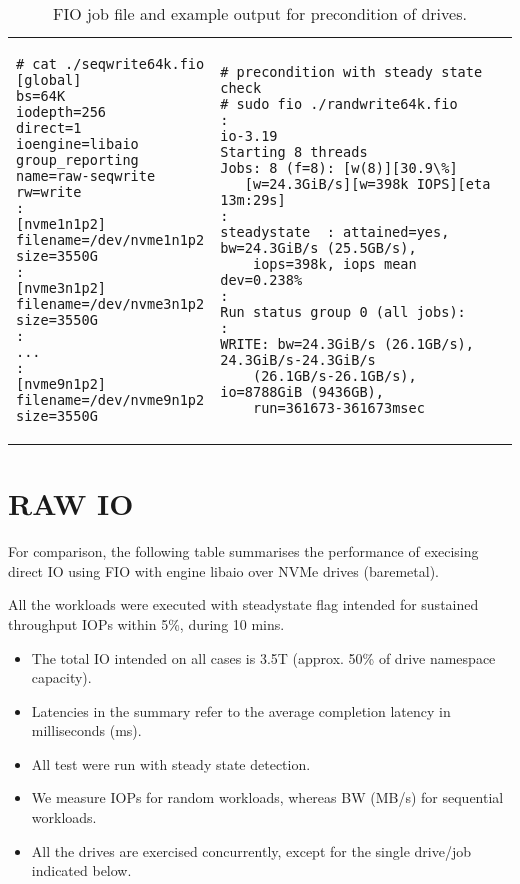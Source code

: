 \begin{table}[h!]
\centering
\begin{tabular}{V{0.35\textwidth}V{0.60\textwidth}}
\toprule
\begin{verbatim}
# cat ./seqwrite64k.fio
[global]
bs=64K
iodepth=256
direct=1
ioengine=libaio
group_reporting
name=raw-seqwrite
rw=write
:
[nvme1n1p2]
filename=/dev/nvme1n1p2
size=3550G
:
[nvme3n1p2]
filename=/dev/nvme3n1p2
size=3550G
:
...
:
[nvme9n1p2]
filename=/dev/nvme9n1p2
size=3550G
\end{verbatim}
&
\begin{verbatim}
# precondition with steady state check
# sudo fio ./randwrite64k.fio
:
io-3.19
Starting 8 threads
Jobs: 8 (f=8): [w(8)][30.9\%]
   [w=24.3GiB/s][w=398k IOPS][eta 13m:29s]
:
steadystate  : attained=yes, bw=24.3GiB/s (25.5GB/s),
    iops=398k, iops mean dev=0.238%
:
Run status group 0 (all jobs):
:
WRITE: bw=24.3GiB/s (26.1GB/s), 24.3GiB/s-24.3GiB/s
    (26.1GB/s-26.1GB/s), io=8788GiB (9436GB),
    run=361673-361673msec
\end{verbatim}
\\
\end{tabular}
\caption{FIO job file and example output for precondition of drives.}
\label{table:fio-libaio}
\end{table}


\section{RAW IO}

For comparison, the following table summarises the performance of execising direct IO using FIO with engine libaio over
NVMe drives (baremetal).

All the workloads were executed with steadystate flag intended for sustained throughput IOPs within 5\%, during 10 mins. 
\begin{itemize}
  \item The total IO intended on all cases is 3.5T (approx. 50\% of drive namespace capacity).
  \item Latencies in the summary refer to the average completion latency in milliseconds (ms).
  \item All test were run with steady state detection.
  \item We measure IOPs for random workloads, whereas BW (MB/s) for sequential workloads.
  \item All the drives are exercised concurrently, except for the single drive/job indicated below.
\end{itemize}

